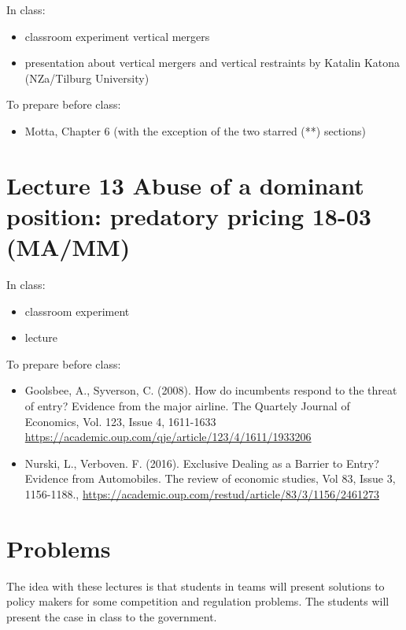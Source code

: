 \documentclass[]{book}
\providecommand{\tightlist}{%
  \setlength{\itemsep}{0pt}\setlength{\parskip}{0pt}}
\begin{document}
In class:

\begin{itemize}
\tightlist
\item
  classroom experiment vertical mergers
\item
  presentation about vertical mergers and vertical restraints by Katalin
  Katona (NZa/Tilburg University)
\end{itemize}

To prepare before class:

\begin{itemize}
\tightlist
\item
  Motta, Chapter 6 (with the exception of the two starred (**) sections)
\end{itemize}

\section{Lecture 13 Abuse of a dominant position: predatory pricing
18-03
(MA/MM)}\label{lecture-13-abuse-of-a-dominant-position-predatory-pricing-18-03-mamm}

In class:

\begin{itemize}
\tightlist
\item
  classroom experiment
\item
  lecture
\end{itemize}

To prepare before class:

\begin{itemize}
\tightlist
\item
  Goolsbee, A., Syverson, C. (2008). How do incumbents respond to the
  threat of entry? Evidence from the major airline. The Quartely Journal
  of Economics, Vol. 123, Issue 4, 1611-1633
  \url{https://academic.oup.com/qje/article/123/4/1611/1933206}
\item
  Nurski, L., Verboven. F. (2016). Exclusive Dealing as a Barrier to
  Entry? Evidence from Automobiles. The review of economic studies, Vol
  83, Issue 3, 1156-1188.,
  \url{https://academic.oup.com/restud/article/83/3/1156/2461273}
\end{itemize}

\section{Problems}\label{problems}

The idea with these lectures is that students in teams will present
solutions to policy makers for some competition and regulation problems.
The students will present the case in class to the government.
\end{document}
